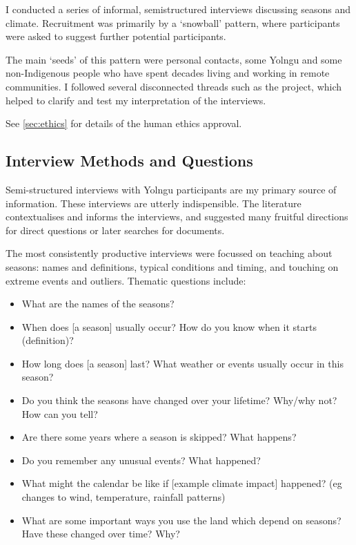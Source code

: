 I conducted a series of informal, semistructured interviews discussing
seasons and climate. Recruitment was primarily by a `snowball' pattern,
where participants were asked to suggest further potential participants.

The main `seeds' of this pattern were personal contacts, some Yolngu and some
non-Indigenous people who have spent decades living and working in remote
communities. I followed several disconnected threads such as the
\citet{CSIROcals} project, which helped to clarify and test my interpretation
of the interviews.

See \autoref{sec:ethics} for details of the human ethics approval.


\subsection{Interview Methods and Questions}
Semi-structured interviews with Yolngu participants are my primary source
of information.  These interviews are utterly indispensible.
The literature contextualises and informs the interviews, and suggested many fruitful
directions for direct questions or later searches for documents.

The most consistently productive interviews were focussed on teaching about
seasons: names and definitions, typical conditions and timing, and touching on
extreme events and outliers. Thematic questions include:
\begin{itemize}
\item What are the names of the seasons?
\item When does [a season] usually occur?  How do you know when it starts (definition)?
\item How long does [a season] last?  What weather or events usually occur in this season?
\item Do you think the seasons have changed over your lifetime?  Why/why not?  How can you tell?
\item Are there some years where a season is skipped?  What happens?
\item Do you remember any unusual events?  What happened?
\item What might the calendar be like if [example climate impact] happened?
      (eg changes to wind, temperature, rainfall patterns)
\item What are some important ways you use the land which depend on seasons?
        Have these changed over time?  Why?
\end{itemize}

